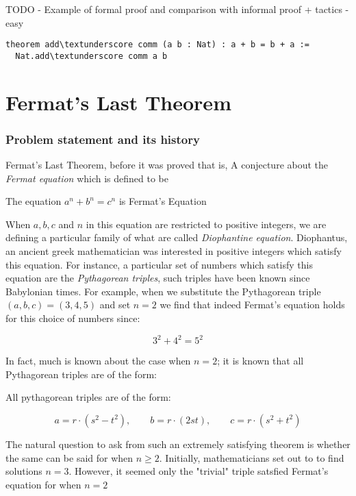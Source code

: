 TODO - Example of formal proof and comparison with informal proof + tactics - easy


\begin{verbatim}
theorem add\textunderscore comm (a b : Nat) : a + b = b + a :=
  Nat.add\textunderscore comm a b
\end{verbatim}


\section{Fermat's Last Theorem}


\subsubsection{Problem statement and its history}
Fermat's Last Theorem, before it was proved that is, A conjecture about the \textit{Fermat equation} which is defined to be

\begin{definition}
    The equation $a^n + b^n = c^n$ is Fermat's Equation
\end{definition}

When $a, b, c$ and $n$ in this equation are restricted to positive integers, we are defining a particular family of what are called \textit{Diophantine equation}.
Diophantus, an ancient greek mathematician was interested in positive integers which satisfy this equation. For instance, a particular set of numbers which satisfy this equation 
are the \textit{Pythagorean triples}, such triples have been known since Babylonian times. For example, when we substitute the Pythagorean triple $(a,b,c) = (3,4,5)$ and set $n = 2$ we find that 
indeed Fermat's equation holds for this choice of numbers since:

\[
3^2 + 4^2 = 5^2
\]

In fact, much is known about the case when $n = 2$; it is known that all Pythagorean triples are of the form:

\begin{theorem}
    All pythagorean triples are of the form:

    \[
    a = r \cdot (s^2 - t^2), \qquad b = r \cdot (2st), \qquad c = r \cdot (s^2 + t^2)
    \]
\end{theorem}

The natural question to ask from such an extremely satisfying theorem is whether the same can be said for when $n \ge 2$. Initially, mathematicians set out to
to find solutions $n = 3$. However, it seemed only the "trivial" triple satsfied Fermat's equation for when $n = 2$

